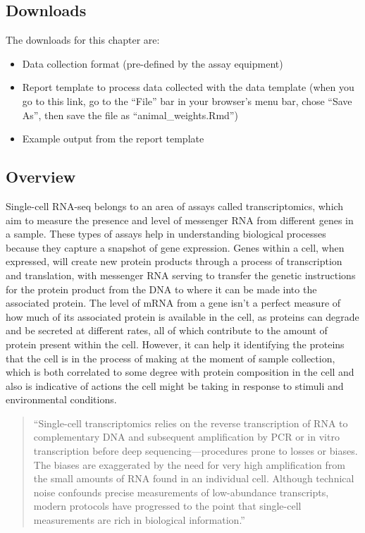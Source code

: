 \documentclass[
]{book}
\providecommand{\tightlist}{%
  \setlength{\itemsep}{0pt}\setlength{\parskip}{0pt}}
\begin{document}
\hypertarget{downloads-3}{%
\subsection{Downloads}\label{downloads-3}}

The downloads for this chapter are:

\begin{itemize}
\tightlist
\item
  Data collection format (pre-defined by the assay equipment)
\item
  Report template to process data collected with the data template (when you go to this link, go to the ``File'' bar in your browser's menu bar, chose ``Save As'', then save the file as ``animal\_weights.Rmd'')
\item
  Example output from the report template
\end{itemize}

\hypertarget{overview-3}{%
\subsection{Overview}\label{overview-3}}

Single-cell RNA-seq belongs to an area of assays called transcriptomics,
which aim to measure the presence and level of messenger RNA from different
genes in a sample. These types of assays help in understanding biological
processes because they capture a snapshot of gene expression. Genes within
a cell, when expressed, will create new protein products through a process
of transcription and translation, with messenger RNA serving to transfer the
genetic instructions for the protein product from the DNA to where it can
be made into the associated protein. The level of mRNA from a gene isn't
a perfect measure of how much of its associated protein is available in the
cell, as proteins can degrade and be secreted at different rates, all of
which contribute to the amount of protein present within the cell. However,
it can help it identifying the proteins that the cell is in the process of
making at the moment of sample collection, which is both correlated to
some degree with protein composition in the cell and also is indicative of
actions the cell might be taking in response to stimuli and environmental
conditions.

\begin{quote}
``Single-cell transcriptomics relies on the reverse transcription of RNA to
complementary DNA and subsequent amplification by PCR or in vitro transcription
before deep sequencing---procedures prone to losses or biases. The biases are
exaggerated by the need for very high amplification from the small amounts of
RNA found in an individual cell. Although technical noise confounds precise
measurements of low-abundance transcripts, modern protocols have progressed to
the point that single-cell measurements are rich in biological information.''
\citep{sandberg2014entering}
\end{quote}
\end{document}
